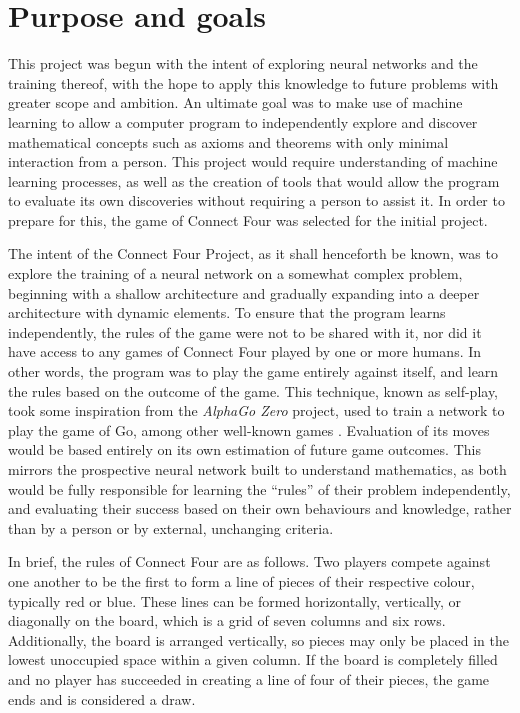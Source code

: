 \documentclass[12pt]{article}
\begin{document}
\section{Purpose and goals}
This project was begun with the intent of exploring neural networks and the training thereof, with the hope to apply this knowledge to future problems with greater scope and ambition. An ultimate goal was to make use of machine learning to allow a computer program to independently explore and discover mathematical concepts such as axioms and theorems with only minimal interaction from a person. This project would require understanding of machine learning processes, as well as the creation of tools that would allow the program to evaluate its own discoveries without requiring a person to assist it. In order to prepare for this, the game of Connect Four was selected for the initial project.

The intent of the Connect Four Project, as it shall henceforth be known, was to explore the training of a neural network on a somewhat complex problem, beginning with a shallow architecture and gradually expanding into a deeper architecture with dynamic elements. To ensure that the program learns independently, the rules of the game were not to be shared with it, nor did it have access to any games of Connect Four played by one or more humans. In other words, the program was to play the game entirely against itself, and learn the rules based on the outcome of the game. This technique, known as self-play, took some inspiration from the \textit{AlphaGo Zero} project, used to train a network to play the game of Go, among other well-known games \cite{AlphaGo}. Evaluation of its moves would be based entirely on its own estimation of future game outcomes. This mirrors the prospective neural network built to understand mathematics, as both would be fully responsible for learning the “rules” of their problem independently, and evaluating their success based on their own behaviours and knowledge, rather than by a person or by external, unchanging criteria.

In brief, the rules of Connect Four are as follows. Two players compete against one another to be the first to form a line of pieces of their respective colour, typically red or blue. These lines can be formed horizontally, vertically, or diagonally on the board, which is a grid of seven columns and six rows. Additionally, the board is arranged vertically, so pieces may only be placed in the lowest unoccupied space within a given column. If the board is completely filled and no player has succeeded in creating a line of four of their pieces, the game ends and is considered a draw.
\end{document}
